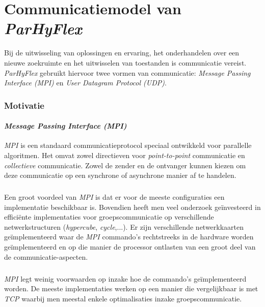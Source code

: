 \chapter{Communicatiemodel van \emph{ParHyFlex}}


Bij de uitwisseling van oplossingen en ervaring, het onderhandelen over een nieuwe zoekruimte en het uitwisselen van toestanden is communicatie vereist. \emph{ParHyFlex} gebruikt hiervoor twee vormen van communicatie: \emph{Message Passing Interface (MPI)} en \emph{User Datagram Protocol (UDP)}.

\subsection{Motivatie}

\subsubsection{\emph{Message Passing Interface (MPI)}}

\emph{MPI} is een standaard communicatieprotocol speciaal ontwikkeld voor parallelle algoritmen. Het omvat zowel directieven voor \emph{point-to-point} communicatie en \emph{collectieve} communicatie. Zowel de zender en de ontvanger kunnen kiezen om deze communicatie op een synchrone of asynchrone manier af te handelen.

\paragraph{}
Een groot voordeel van \emph{MPI} is dat er voor de meeste configuraties een implementatie beschikbaar is. Bovendien heeft men veel onderzoek ge\"investeerd in effici\"ente implementaties voor groepscommunicatie op verschillende netwerkstructuren (\emph{hypercube}, \emph{cycle},...). Er zijn verschillende netwerkkaarten ge\"implementeerd waar de \emph{MPI} commando's rechtstreeks in de hardware worden ge\"implementeerd en op die manier de processor ontlasten van een groot deel van de communicatie-aspecten.

\paragraph{}
\emph{MPI} legt weinig voorwaarden op inzake hoe de commando's ge\"implementeerd worden. De meeste implementaties werken op een manier die vergelijkbaar is met \emph{TCP} waarbij men meestal enkele optimalisaties inzake groepscommunicatie.

